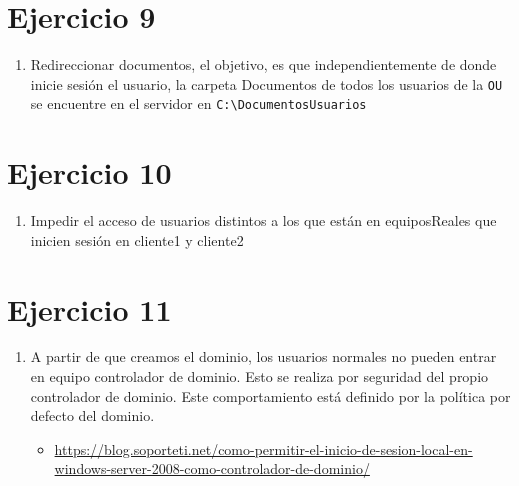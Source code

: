 \documentclass[11pt]{article}
\begin{document}
\section{Ejercicio 9}
\label{sec:orge55a34f}
\begin{enumerate}
\item Redireccionar documentos, el objetivo, es que independientemente de donde inicie sesión el usuario, la carpeta Documentos de todos los usuarios de la \texttt{OU} se encuentre en el
servidor en \texttt{C:\textbackslash{}DocumentosUsuarios}
\end{enumerate}


\section{Ejercicio 10}
\label{sec:orgfc94f6a}
\begin{enumerate}
\item Impedir el acceso de usuarios distintos a los que están en equiposReales que inicien sesión en cliente1 y cliente2
\end{enumerate}


\section{Ejercicio 11}
\label{sec:org411654c}
\begin{enumerate}
\item A partir de que creamos el dominio, los usuarios normales no pueden entrar en equipo controlador de dominio. Esto se realiza por seguridad del propio controlador de dominio.
Este comportamiento está definido por la política por defecto del dominio.
\begin{itemize}
\item \url{https://blog.soporteti.net/como-permitir-el-inicio-de-sesion-local-en-windows-server-2008-como-controlador-de-dominio/}
\end{itemize}
\end{enumerate}
\end{document}
